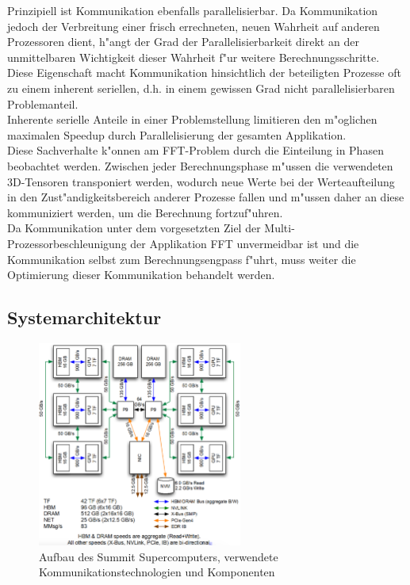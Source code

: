 Prinzipiell ist Kommunikation ebenfalls parallelisierbar. Da Kommunikation jedoch der Verbreitung einer frisch errechneten, neuen Wahrheit auf anderen Prozessoren dient, h"angt der Grad der Parallelisierbarkeit direkt an der unmittelbaren Wichtigkeit dieser Wahrheit f"ur weitere Berechnungsschritte.\\
Diese Eigenschaft macht Kommunikation hinsichtlich der beteiligten Prozesse oft zu einem inherent seriellen, d.h. in einem gewissen Grad nicht parallelisierbaren Problemanteil.\\
Inherente serielle Anteile in einer Problemstellung limitieren den m"oglichen maximalen Speedup durch Parallelisierung der gesamten Applikation.\\
Diese Sachverhalte k"onnen am FFT-Problem durch die Einteilung in Phasen beobachtet werden. Zwischen jeder Berechnungsphase m"ussen die verwendeten 3D-Tensoren transponiert werden, wodurch neue Werte bei der Werteaufteilung in den Zust"andigkeitsbereich anderer Prozesse fallen und m"ussen daher an diese kommuniziert werden, um die Berechnung fortzuf"uhren.\\
Da Kommunikation unter dem vorgesetzten Ziel der Multi-Prozessorbeschleunigung der Applikation FFT unvermeidbar ist und die Kommunikation selbst zum Berechnungsengpass f"uhrt, muss weiter die Optimierung dieser Kommunikation behandelt werden.


\subsection{Systemarchitektur}

\begin{figure}
\centering
\includegraphics[width=0.6\textwidth]{res/architecture.png}
\caption{\cite[Abb. 1]{mainpaper} Aufbau des Summit Supercomputers, verwendete Kommunikationstechnologien und Komponenten}
	\label{fig:architecture}
\end{figure}

